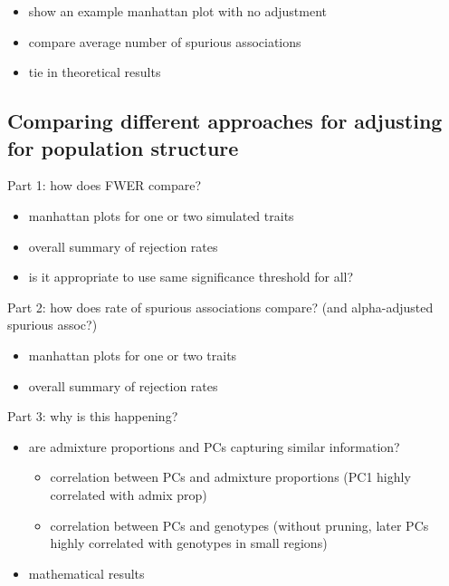 \documentclass[12pt]{article}
\begin{document}
\begin{itemize}
\item show an example manhattan plot with no adjustment
\item compare average number of spurious associations
\item tie in theoretical results
\end{itemize}

\subsection{Comparing different approaches for adjusting for population structure}

Part 1: how does FWER compare?

\begin{itemize}
\item manhattan plots for one or two simulated traits
\item overall summary of rejection rates
\item is it appropriate to use same significance threshold for all?
\end{itemize}

\noindent Part 2: how does rate of spurious associations compare? (and alpha-adjusted spurious assoc?)

\begin{itemize}
\item manhattan plots for one or two traits
\item overall summary of rejection rates
\end{itemize}

\noindent Part 3: why is this happening?

\begin{itemize}
\item are admixture proportions and PCs capturing similar information?
	\begin{itemize}
	\item correlation between PCs and admixture proportions (PC1 highly correlated with admix prop)
	\item correlation between PCs and genotypes (without pruning, later PCs highly correlated with genotypes in small regions)
	\end{itemize}
\item mathematical results
\end{itemize}


%
%
\end{document}
